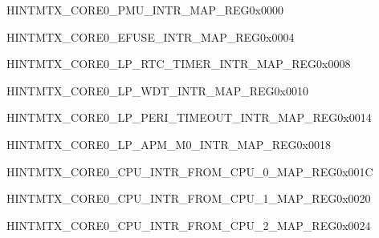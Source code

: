\begin{register}{H}{INTMTX\_CORE0\_PMU\_INTR\_MAP\_REG}{0x0000}\label{regdesc:INTMTXCORE0PMUINTRMAPREG}
\end{register}\vspace{-3em}


\begin{register}{H}{INTMTX\_CORE0\_EFUSE\_INTR\_MAP\_REG}{0x0004}\label{regdesc:INTMTXCORE0EFUSEINTRMAPREG}
\end{register}\vspace{-3em}


\begin{register}{H}{INTMTX\_CORE0\_LP\_RTC\_TIMER\_INTR\_MAP\_REG}{0x0008}\label{regdesc:INTMTXCORE0LPRTCTIMERINTRMAPREG}
\end{register}\vspace{-3em}





\begin{register}{H}{INTMTX\_CORE0\_LP\_WDT\_INTR\_MAP\_REG}{0x0010}\label{regdesc:INTMTXCORE0LPWDTINTRMAPREG}
\end{register}\vspace{-3em}



\begin{register}{H}{INTMTX\_CORE0\_LP\_PERI\_TIMEOUT\_INTR\_MAP\_REG}{0x0014}\label{regdesc:INTMTXCORE0LPPERITIMEOUTINTRMAPREG}
\end{register}\vspace{-3em}


\begin{register}{H}{INTMTX\_CORE0\_LP\_APM\_M0\_INTR\_MAP\_REG}{0x0018}\label{regdesc:INTMTXCORE0LPAPMM0INTRMAPREG}
\end{register}\vspace{-3em}


\begin{register}{H}{INTMTX\_CORE0\_CPU\_INTR\_FROM\_CPU\_0\_MAP\_REG}{0x001C}\label{regdesc:INTMTXCORE0CPUINTRFROMCPU0MAPREG}
\end{register}\vspace{-3em}


\begin{register}{H}{INTMTX\_CORE0\_CPU\_INTR\_FROM\_CPU\_1\_MAP\_REG}{0x0020}\label{regdesc:INTMTXCORE0CPUINTRFROMCPU1MAPREG}
\end{register}\vspace{-3em}


\begin{register}{H}{INTMTX\_CORE0\_CPU\_INTR\_FROM\_CPU\_2\_MAP\_REG}{0x0024}\label{regdesc:INTMTXCORE0CPUINTRFROMCPU2MAPREG}
\end{register}\vspace{-3em}


